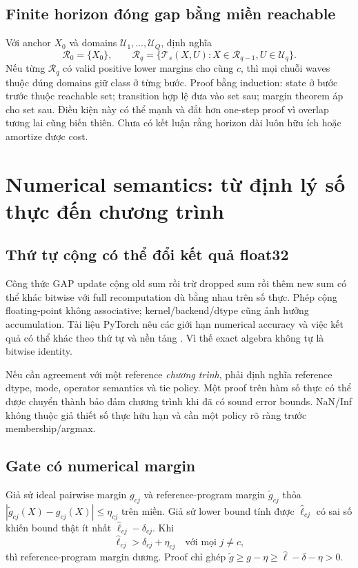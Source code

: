 \documentclass[11pt,a4paper]{article}
\newcommand{\Uset}{\mathcal U}
\theoremstyle{definition}
\begin{document}
\subsection{Finite horizon đóng gap bằng miền reachable}
Với anchor $X_0$ và domains $\Uset_1,\ldots,\Uset_Q$, định nghĩa
\begin{equation}
\mathcal R_0=\{X_0\},\qquad
\mathcal R_q=\{\mathcal T_s(X,U):X\in\mathcal R_{q-1},U\in\Uset_q\}.
\end{equation}
Nếu từng $\mathcal R_q$ có valid positive lower margins cho cùng $c$,
thì mọi chuỗi waves thuộc đúng domains giữ class ở từng bước. Proof
bằng induction: state ở bước trước thuộc reachable set; transition hợp
lệ đưa vào set sau; margin theorem áp cho set sau. Điều kiện này có thể
mạnh và đắt hơn one-step proof vì overlap tương lai cũng biến thiên.
Chưa có kết luận rằng horizon dài luôn hữu ích hoặc amortize được cost.

\section{Numerical semantics: từ định lý số thực đến chương trình}
\subsection{Thứ tự cộng có thể đổi kết quả float32}
Công thức GAP update cộng old sum rồi trừ dropped sum rồi thêm new sum
có thể khác bitwise với full recomputation dù bằng nhau trên số thực.
Phép cộng floating-point không associative; kernel/backend/dtype cũng
ảnh hưởng accumulation. Tài liệu PyTorch nêu các giới hạn numerical
accuracy và việc kết quả có thể khác theo thứ tự và nền tảng
\cite{torchnumerical}. Vì thế exact algebra không tự là bitwise identity.

Nếu cần agreement với một reference \emph{chương trình}, phải định nghĩa
reference dtype, mode, operator semantics và tie policy. Một proof trên
hàm số thực có thể được chuyển thành bảo đảm chương trình khi đã có
sound error bounds. NaN/Inf không thuộc giả thiết số thực hữu hạn và
cần một policy rõ ràng trước membership/argmax.

\subsection{Gate có numerical margin}
Giả sử ideal pairwise margin $g_{cj}$ và reference-program margin
$\widetilde g_{cj}$ thỏa
$|\widetilde g_{cj}(X)-g_{cj}(X)|\le\eta_{cj}$ trên miền. Giả sử lower
bound tính được $\widehat\ell_{cj}$ có sai số khiến bound thật ít nhất
$\widehat\ell_{cj}-\delta_{cj}$. Khi
\begin{equation}
\widehat\ell_{cj}>\delta_{cj}+\eta_{cj}
\quad\text{với mọi }j\ne c,
\end{equation}
thì reference-program margin dương. Proof chỉ ghép
$\widetilde g\ge g-\eta\ge\widehat\ell-\delta-\eta>0$.
\end{document}
